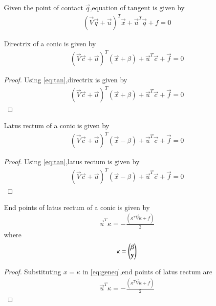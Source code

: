 \documentclass[journal,12pt,twocolumn]{IEEEtran}
\begin{document}
\begin{lemma}
Given the point of contact $\vec{q}$,equation of tangent is given by
\begin{align}
    (\vec{V}\vec{q} + \vec{u})^T\vec{x} + \vec{u}^T\vec{q} + f = 0 \label{eq:tan}
\end{align}
\end{lemma}

\begin{lemma}
Directrix of a conic is given by
\begin{align}
(\vec{V}\vec{c}+\vec{u})^T(\vec{x} +\beta) + \vec{u}^T\vec{c} + \vec{f} = 0 \label{eq:directrix}
\end{align}
\end{lemma}

\begin{proof}
Using \eqref{eq:tan},directrix is given by
\begin{align}
    (\vec{V}\vec{c}+\vec{u})^T(\vec{x} +\beta) + \vec{u}^T\vec{c} + \vec{f} = 0
\end{align}
\end{proof}

\begin{lemma}
Latus rectum of a conic is given by 
\begin{align}
(\vec{V}\vec{c}+\vec{u})^T(\vec{x} -\beta) + \vec{u}^T\vec{c} + \vec{f} = 0 \label{eq:latus}
\end{align}
\end{lemma}

\begin{proof}
Using \eqref{eq:tan},latus rectum is given by
\begin{align}
(\vec{V}\vec{c}+\vec{u})^T(\vec{x} -\beta) + \vec{u}^T\vec{c} + \vec{f} = 0
\end{align}
\end{proof}

\begin{lemma}
End points of latus rectum of a conic is given by
\begin{align}
\vec{u}^T\kappa = -\frac{(\kappa^T\vec{V}\kappa + f )}{2} \label{eq:endpt}
\end{align}
where
\begin{align}
\kappa = \begin{pmatrix}\beta \\ \mathbf{y}\end{pmatrix}
\end{align}
\end{lemma}

\begin{proof}
Substituting $x=\kappa$ in \eqref{eq:geneq},end points of latus rectum are
\begin{align}
\vec{u}^T\kappa = -\frac{(\kappa^T\vec{V}\kappa + f )}{2}
\end{align}
\end{proof}
\end{document}
